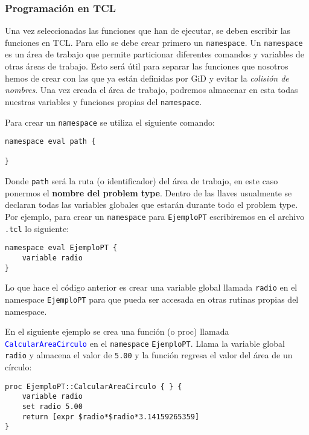 \documentclass[10pt, a4paper, twocolumn]{article} %
\begin{document}
\subsubsection{Programación en TCL}

Una vez seleccionadas las funciones que han de ejecutar, se deben escribir las funciones en TCL. Para ello se debe crear primero un \texttt{namespace}. Un \texttt{namespace} es un área de trabajo que permite particionar diferentes comandos y variables de otras áreas de trabajo. Esto será útil para separar las funciones que nosotros hemos de crear con las que ya están definidas por GiD y evitar la \textit{colisión de nombres}. Una vez creada el área de trabajo, podremos almacenar en esta todas nuestras variables y funciones propias del \texttt{namespace}.

Para crear un \texttt{namespace} se utiliza el siguiente comando:

\lstset{language=tcl} 
\begin{lstlisting}[caption={Crear un namespace en TCL.}]
namespace eval path {

}
\end{lstlisting}

Donde \texttt{path} será la ruta (o identificador) del área de trabajo, en este caso ponermos el \textbf{nombre del problem type}. Dentro de las llaves usualmente se declaran todas las variables globales que estarán durante todo el problem type. Por ejemplo, para crear un \texttt{namespace} para \texttt{EjemploPT} escribiremos en el archivo \texttt{.tcl} lo siguiente:

\lstset{language=tcl} 
\begin{lstlisting}[caption={Declarar una variable propia del namespace.}]
namespace eval EjemploPT {
	variable radio
}
\end{lstlisting}

Lo que hace el código anterior es crear una variable global llamada \texttt{radio} en el namespace \texttt{EjemploPT} para que pueda ser accesada en otras rutinas propias del namespace.

En el siguiente ejemplo se crea una función (o proc) llamada \textcolor{blue}{\texttt{CalcularAreaCirculo}} en el \texttt{namespace} \texttt{EjemploPT}. Llama la variable global \texttt{radio} y almacena el valor de \texttt{5.00} y la función regresa el valor del área de un círculo:

\lstset{language=tcl} 
\begin{lstlisting}[caption={Función que calcula el área de un círculo.}]
proc EjemploPT::CalcularAreaCirculo { } {
	variable radio	
	set radio 5.00
	return [expr $radio*$radio*3.14159265359]
}
\end{lstlisting}
\end{document}
